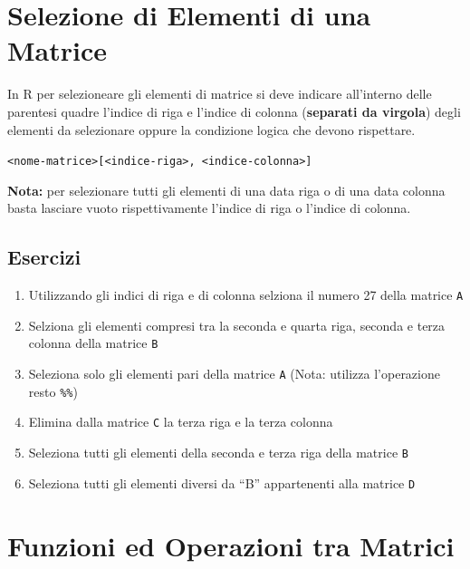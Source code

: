\documentclass[
]{book}
\providecommand{\tightlist}{%
  \setlength{\itemsep}{0pt}\setlength{\parskip}{0pt}}
\begin{document}
\hypertarget{selezione-di-elementi-di-una-matrice}{%
\section{Selezione di Elementi di una Matrice}\label{selezione-di-elementi-di-una-matrice}}

In R per selezioneare gli elementi di matrice si deve indicare all'interno delle parentesi quadre l'indice di riga e l'indice di colonna (\textbf{separati da virgola}) degli elementi da selezionare oppure la condizione logica che devono rispettare.

\texttt{\textless{}nome-matrice\textgreater{}{[}\textless{}indice-riga\textgreater{},\ \textless{}indice-colonna\textgreater{}{]}}

\textbf{Nota:} per selezionare tutti gli elementi di una data riga o di una data colonna basta lasciare vuoto rispettivamente l'indice di riga o l'indice di colonna.

\hypertarget{esercizi-6}{%
\subsection*{Esercizi}\label{esercizi-6}}

\begin{enumerate}
\def\labelenumi{\arabic{enumi}.}
\tightlist
\item
  Utilizzando gli indici di riga e di colonna selziona il numero 27 della matrice \texttt{A}
\item
  Selziona gli elementi compresi tra la seconda e quarta riga, seconda e terza colonna della matrice \texttt{B}
\item
  Seleziona solo gli elementi pari della matrice \texttt{A} (Nota: utilizza l'operazione resto \texttt{\%\%})
\item
  Elimina dalla matrice \texttt{C} la terza riga e la terza colonna
\item
  Seleziona tutti gli elementi della seconda e terza riga della matrice \texttt{B}
\item
  Seleziona tutti gli elementi diversi da ``B'' appartenenti alla matrice \texttt{D}
\end{enumerate}

\hypertarget{funzioni-ed-operazioni-tra-matrici}{%
\section{Funzioni ed Operazioni tra Matrici}\label{funzioni-ed-operazioni-tra-matrici}}
\end{document}
